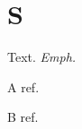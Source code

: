 \documentclass{article}
\newenvironment{myenv}{\begingroup\itshape}{\endgroup}
\begin{document}
\section{S}Text. \begin{myenv} Emph.

 A ref.

 B ref.
\end{document}
